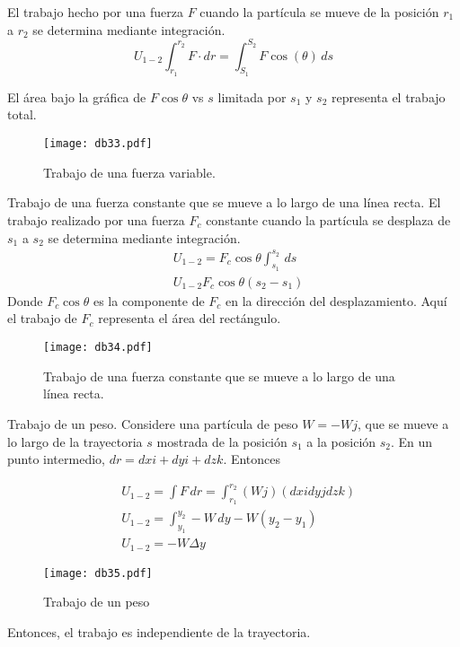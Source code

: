 \begin{definition}
    El trabajo hecho por una fuerza $F$ cuando la partícula se mueve
de la posición $r_1$ a $r_2$ se determina mediante integración.
\begin{equation}
    U_{1-2} \int_{r_1}^{r_2}F\cdot dr = \int_{S_1}^{S_2} F\cos{(\theta)}\, ds
\end{equation}
\end{definition}
El área bajo la gráfica de $F\cos{\theta}$ vs $s$ limitada por $s_1$ y $s_2$ representa el trabajo total.
\begin{figure}[h!]
\centering
  \texttt{[image: db33.pdf]}
  \caption{Trabajo de una fuerza variable. }
  \label{db33}
\end{figure}
Trabajo de una fuerza constante que se mueve a lo largo de una línea recta. El trabajo realizado por una fuerza $F_c$ constante cuando la partícula se desplaza de $s_1$ a $s_2$ se determina mediante integración.
\begin{align*}
    &U_{1-2} = F_c\cos{\theta}\int_{s_1}^{s_2}\,ds\\
    &U_{1-2} F_c\cos{\theta}\left(s_2 - s_1\right)
\end{align*}
Donde $F_c\cos{\theta}$ es la componente de $F_c$ en la dirección del desplazamiento.
Aquí el trabajo de $F_c$ representa el área del rectángulo.

\begin{figure}[h!]
\centering
  \texttt{[image: db34.pdf]}
  \caption{Trabajo de una fuerza constante que se mueve a lo largo de una línea recta.}
  \label{db34}
\end{figure}

Trabajo de un peso. Considere una partícula de peso $W=-Wj$, que se mueve a lo largo de la trayectoria $s$ mostrada de la posición $s_1$ a la posición $s_2$. En un punto intermedio, $dr=dxi+dyi+dzk$. Entonces

\begin{align*}
    &U_{1 -2} = \int F\,dr = \int_{r_1}^{r_2}( Wj)(dxi dyj dzk)\\
    &U_{1 -2} = \int_{y_1}^{y_2} - W\,dy - W(y_2 - y_{1})\\
    &U_{1- 2 } =- W\Delta y
\end{align*}
\begin{figure}[h!]
    \centering
      \texttt{[image: db35.pdf]}
      \caption{Trabajo de un peso}
      \label{db35}
\end{figure}
Entonces, el trabajo es independiente de la trayectoria.


